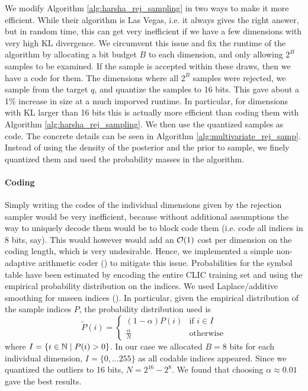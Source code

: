 \par
We modify Algorithm \ref{alg:harsha_rej_sampling} in two ways to make it more
efficient. While their algorithm is Las Vegas, i.e. it always gives the right
answer, but in random time, this can get very inefficient if we have a few
dimensions with very high KL divergence. We circumvent this issue and fix the
runtime of the algorithm by allocating a bit budget $B$ to each dimension, and
only allowing $2^B$ samples to be examined. If the sample is accepted within
these draws, then we have a code for them. The dimensions where all $2^B$ samples were
rejected, we sample from the target $q$, and quantize the samples to 16 bits.
This gave about a 1\% increase in size at a much imporved runtime. In
particular, for dimensions with KL larger than 16 bits this is actually more
efficient than coding them with Algorithm \ref{alg:harsha_rej_sampling}.
We then use the quantized samples as code. The concrete details can be seen in Algorithm
\ref{alg:multivariate_rej_samp}. Instead of using the density of the posterior
and the prior to sample, we finely quantized them and used the probability
masses in the algorithm.


\paragraph{Coding}
Simply writing the codes of the individual dimensions given by the rejection
sampler would be very inefficient, because without additional assumptions the
way to uniquely decode them would be to block code them (i.e. code all indices
in 8 bits, say). This would however would add an $\mathcal{O}(1)$ cost per dimension on
the coding length, which is very undesirable. Hence, we implemented a simple
non-adaptive arithmetic coder (\cite{rissanen1981universal}) to mitigate this issue.
Probabilities for the symbol table have been estimated by encoding the entire
CLIC training set and using the empirical probability distribution on the
indices. We used Laplace/additive smoothing for unseen indices (\cite{chen1999empirical}).
In particular, given the empirical distribution of the sample indices $P$,
the probability distribution used is
\[
  \tilde{P}(i) = \begin{cases}
    (1 - \alpha)P(i) & \text{if } i \in I \\
    \frac{\alpha}{N} & \text{otherwise}
    \end{cases}
\]
where $I = \{i \in \mathbb{N} \mid P(i) > 0\}$.
In our case we allocated $B = 8$ bits for each individual dimension,
$I = \{0, \hdots 255\}$ as all codable indices appeared. Since we quantized the
outliers to 16 bits, $N = 2^{16} - 2^{8}$. We found that choosing $\alpha
\approx 0.01$ gave the best results.

